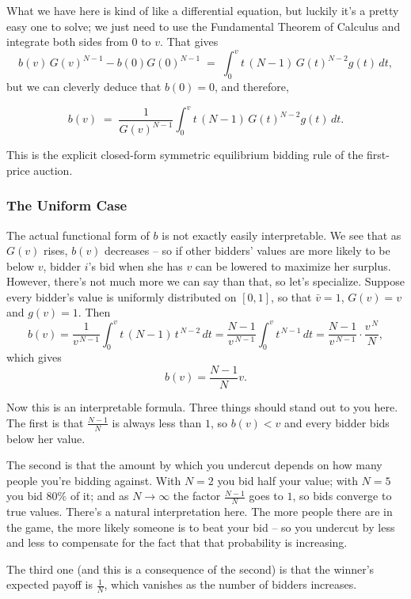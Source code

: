 \documentclass[12pt]{article}
\newcommand{\vbar}{\bar{v}}
\theoremstyle{definition}
\theoremstyle{remark}
\theoremstyle{plain}                          %
\begin{document}
What we have here is kind of like a differential equation, but luckily it's a pretty easy one to solve; we just need to use the Fundamental Theorem of Calculus and integrate both sides from $0$ to $v$. That gives
\[
  b(v)\,G(v)^{N-1}-b(0)G(0)^{N-1} \;=\; \int_0^v t\,(N-1)\,G(t)^{N-2} g(t)\,dt,
\]
but we can cleverly deduce that $b(0)=0$, and therefore,
\begin{keybox}
\begin{equation}
  b(v) \;=\; \frac{1}{G(v)^{N-1}} \int_0^v t\,(N-1)\,G(t)^{N-2} g(t)\,dt.
\end{equation}
\end{keybox}
\noindent This is the explicit closed-form symmetric equilibrium bidding rule of the first-price auction.

\subsubsection{The Uniform Case}

The actual functional form of $b$ is not exactly easily interpretable. We see that as $G(v)$ rises, $b(v)$ decreases -- so if other bidders' values are more likely to be below $v$, bidder $i$'s bid when she has $v$ can be lowered to maximize her surplus. However, there's not much more we can say than that, so let's specialize. Suppose every bidder's value is uniformly distributed on $[0,1]$, so that $\vbar=1$, $G(v)=v$ and $g(v)=1$. Then
\[
  b(v)
  = \frac{1}{v^{\,N-1}} \int_0^v t\,(N-1)\,t^{\,N-2}\,dt
  = \frac{N-1}{v^{\,N-1}} \int_0^v t^{\,N-1}\,dt
  = \frac{N-1}{v^{\,N-1}} \cdot \frac{v^{\,N}}{N},
\]
which gives $$b(v)=\dfrac{N-1}{N}v.$$

\noindent
Now this is an interpretable formula. Three things should stand out to you here. The first is that $\tfrac{N-1}{N}$ is always less than $1$, so $b(v)<v$ and every bidder bids below her value.

The second is that the amount by which you undercut depends on how many people you're bidding against. With $N=2$ you bid half your value; with $N=5$ you bid $80\%$ of it; and as $N \to \infty$ the factor $\tfrac{N-1}{N}$ goes to $1$, so bids converge to true values. There's a natural interpretation here. The more people there are in the game, the more likely someone is to beat your bid -- so you undercut by less and less to compensate for the fact that that probability is increasing.

The third one (and this is a consequence of the second) is that the winner's expected payoff is $\tfrac{1}{N}$, which vanishes as the number of bidders increases.
\end{document}
